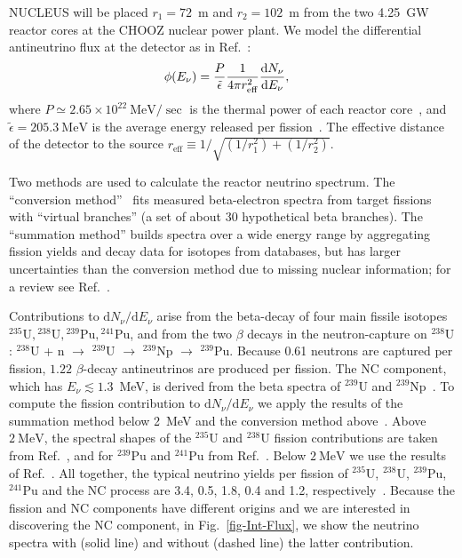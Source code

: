 \documentclass[a4paper,11pt]{article}
\renewcommand\({\left(}
\renewcommand\){\right)}
\renewcommand\[{\left[}
\renewcommand\]{\right]}
\newcommand{\tx}{\text}
\newcommand{\df}{\text{d}}
\newcommand{\al}[1]{\begin{align}#1\end{align}}
\newcommand{\paren}[1]{\left(#1\right)}
\newcommand{\pn}[1]{\left(#1\right)}
\newcommand{\fn}[1]{\!\paren{#1}} %
\theoremstyle{definition}
\newcommand{\ov}{\over}
\newcommand{\MeV}{\text{MeV}}
\begin{document}
NUCLEUS will be placed $r_1=72$~m and $r_2=102$~m from the two 4.25~GW reactor cores at the CHOOZ nuclear power plant. 
We model the differential antineutrino flux at the detector as in Ref.~\cite{Liao:2023kyy}:
\al{
    {\phi\fn{E_\nu}} &= {P\ov \tilde \epsilon} {1\ov 4\pi r_\tx{eff}^2}{\df N_\nu\ov \df E_\nu},
    \label{phi-nu-dNdE}
}
where $P \simeq 2.65\times 10^{22}~\MeV/\sec$ is the thermal power of each reactor core~\cite{Apollonio:2002gd}, and $\tilde \epsilon = 205.3~\MeV$ is the average energy released per fission~\cite{Kopeikin:2004cn,Ma:2012bm}. The effective distance of the detector to the source $r_\tx{eff}\equiv 1/\sqrt{\pn{1 / r_1^2} + \pn{1 / r_2^2}}$.

Two methods are used to calculate the reactor neutrino spectrum. The ``conversion method''~\cite{Mueller:2011nm,Huber:2011wv,Kopeikin:2021ugh} fits measured beta-electron spectra from target fissions with ``virtual branches'' (a set of about 30 hypothetical beta branches). The ``summation method'' builds spectra over a wide energy range by aggregating fission yields and decay data for isotopes from databases, but has larger uncertainties than the conversion method due to missing nuclear information; for a review see Ref.~\cite{Hayes:2016qnu}.

Contributions to ${\df N_\nu/ \df E_\nu}$ arise from the beta-decay of four main fissile isotopes 
${^{235}\tx{U}}, {^{238}\tx{U}}, {^{239}\tx{Pu}}, {^{241}\tx{Pu}}$, and from the two $\beta$ decays in the neutron-capture on ${^{238}\tx{U}}$: $^{238}$U + n $\to$ $^{239}$U $\to$ $^{239}$Np $\to$ $^{239}$Pu.
Because 0.61 neutrons are captured per fission, $1.22$ $\beta$-decay antineutrinos are produced per fission. 
The NC component, which has $E_\nu \lesssim 1.3$~MeV, is derived from the beta spectra of $^{239}$U and $^{239}$Np~\cite{Kopeikin:1997ve,Wong:2006nx}.
To compute the fission contribution to ${\df N_\nu/ \df E_\nu}$ we apply the results of the summation method below 2~MeV and the conversion method above~\cite{Liao:2023kyy}. 
Above $2~\MeV$, the spectral shapes of the $^{235}$U and $^{238}$U fission contributions are taken from Ref.~\cite{Kopeikin:2021ugh},
and for $^{239}$Pu and $^{241}$Pu from Ref.~\cite{Huber:2011wv}.
Below $2~\MeV$ we use the results of Ref.~\cite{PhysRevD.39.3378}. 
All together, the typical neutrino yields per fission of $^{235}$U, $^{238}$U, $^{239}$Pu, $^{241}$Pu and the NC process are 3.4, 0.5, 1.8, 0.4 and 1.2, respectively~\cite{Wong:2006nx}.
Because the fission and NC components have different origins and we are interested in discovering the NC component, in Fig.~\ref{fig-Int-Flux}, we show the neutrino spectra with (solid line) and without (dashed line) the latter contribution. 
\end{document}
